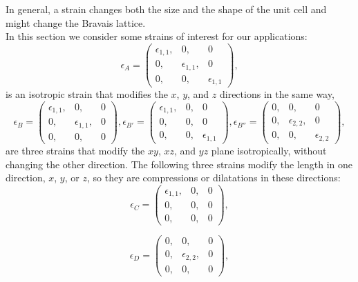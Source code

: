 \documentclass[12pt,a4paper,twoside]{report}
\begin{document}
In general, a strain changes both the size 
and the shape of the unit cell and might change the Bravais lattice. \\
In this section we consider some strains of interest for our applications: 
\begin{equation}
\epsilon_A=\left( \begin{array}{ccc}
\epsilon_{1,1}, & 0, & 0 
\\
0,& \epsilon_{1,1}, & 0 
\\
0,& 0, & \epsilon_{1,1}
\end{array}
\right),
\end{equation}
is an isotropic strain that modifies the $x$, $y$, and $z$ directions in the
same way,
\begin{equation}
\epsilon_B=\left( \begin{array}{ccc}
\epsilon_{1,1},& 0, & 0 
\\
0, & \epsilon_{1,1}, &  0 
\\
0, & 0, &  0
\end{array}
\right),
\epsilon_{B'}=\left( \begin{array}{ccc}
\epsilon_{1,1},& 0, & 0 
\\
0, & 0, &  0
\\
0, & 0, & \epsilon_{1,1}
\end{array}
\right),
\epsilon_{B''}=\left( \begin{array}{ccc}
0, & 0, & 0 
\\
0, & \epsilon_{2,2}, &  0
\\
0, & 0, & \epsilon_{2,2}
\end{array}
\right),
\end{equation}
are three strains that modify the $xy$, $xz$, and $yz$ plane 
isotropically, without changing the other direction.
The following three strains modify the length in one direction, 
$x$, $y$, or $z$, so they are compressions or dilatations in these directions:
\begin{equation}
\epsilon_C=\left( \begin{array}{ccc}
\epsilon_{1,1}, & 0, & 0 
\\
0, & 0, & 0 
\\
0, & 0, & 0
\end{array}
\right),
\end{equation}

\begin{equation}
\epsilon_D=\left( \begin{array}{ccc}
0, & 0, & 0 
\\
0, &  \epsilon_{2,2}, & 0 
\\
0, & 0, & 0
\end{array}
\right),
\end{equation}
\end{document}
